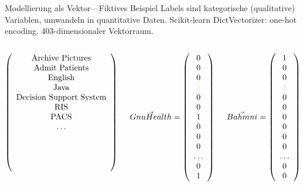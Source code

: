 \documentclass[aspectratio=1610,handout]{beamer}
\newcommand{\both}[1]{{\color[rgb]{0.8,1,0.8}\textbf{#1}}}
\begin{document}
\begin{frame}{Modellierung als Vektor---Fiktives Beispiel}
{
\small
Labels sind kategorische (qualitative) Variablen, umwandeln in quantitative Daten. Scikit-learn DictVectorizer: one-hot encoding. 403-dimensionaler Vektorraum.
}
\begin{columns}
 
 \begin{column}{.4\textwidth}
   \[\left(\begin{array}{c} \textnormal{Archive Pictures} \\ \textnormal{Admit Patients} \\ \textnormal{English} \\ \textnormal{Java} \\ \textnormal{Decision Support System} \\ \textnormal{RIS} \\ \textnormal{PACS} \\ \dots \\ \\ \\ \\ \\ \end{array}\right) \]
 \end{column}
 
 \begin{column}{.25\textwidth}
   \[\vec{GnuHealth}	= \left(\begin{array}{c} 0 \\ 0 \\ 0 \\ \both{1} \\ 0 \\ 0 \\ 1 \\ 0 \\ 0 \\ 0 \\ \ldots \\ 0 \\ 1 \end{array}\right) \]
 \end{column}

 \begin{column}{.25\textwidth}
   \[\vec{Bahmni}		= \left(\begin{array}{c} 1 \\ 0 \\ 0 \\ \both{1} \\ 0 \\ 0 \\ 0 \\ 0 \\ 0 \\ 0 \\ \ldots \\ 0 \\ 0 \end{array}\right) \]
 \end{column}
\end{columns}

\end{frame}
\end{document}

